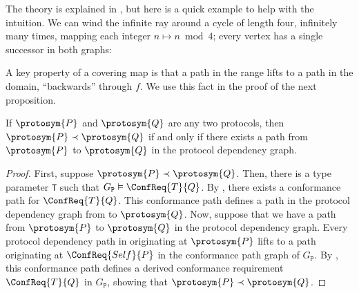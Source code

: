 \documentclass[../generics]{subfiles}
\begin{document}
The theory is explained in \cite{godsil2001algebraic}, but here is a quick example to help with the intuition. We can wind the infinite ray around a cycle of length four, infinitely many times, mapping each integer $n\mapsto n \bmod 4$; every vertex has a single successor in both graphs:
\begin{center}
\end{center}
A key property of a covering map is that a path in the range lifts to a path in the domain, ``backwards'' through $f$. We use this fact in the proof of the next proposition.

\begin{proposition}
If $\protosym{P}$ and $\protosym{Q}$ are any two protocols, then $\protosym{P}\prec\protosym{Q}$ if and only if there exists a path from $\protosym{P}$ to $\protosym{Q}$ in the protocol dependency graph.
\end{proposition}
\begin{proof}
First, suppose $\protosym{P}\prec\protosym{Q}$. Then, there is a type parameter \texttt{T} such that $G_\texttt{P}\vDash\ConfReq{T}{Q}$. By , there exists a conformance path for $\ConfReq{T}{Q}$. This conformance path defines a path in the protocol dependency graph from  to $\protosym{Q}$. Now, suppose that we have a path from $\protosym{P}$ to $\protosym{Q}$ in the protocol dependency graph. Every protocol dependency path in originating at $\protosym{P}$ lifts to a path originating at $\ConfReq{Self}{P}$ in the conformance path graph of $G_\texttt{P}$. By , this conformance path defines a derived conformance requirement $\ConfReq{T}{Q}$ in $G_\texttt{P}$, showing that $\protosym{P}\prec\protosym{Q}$.
\end{proof}
\end{document}
